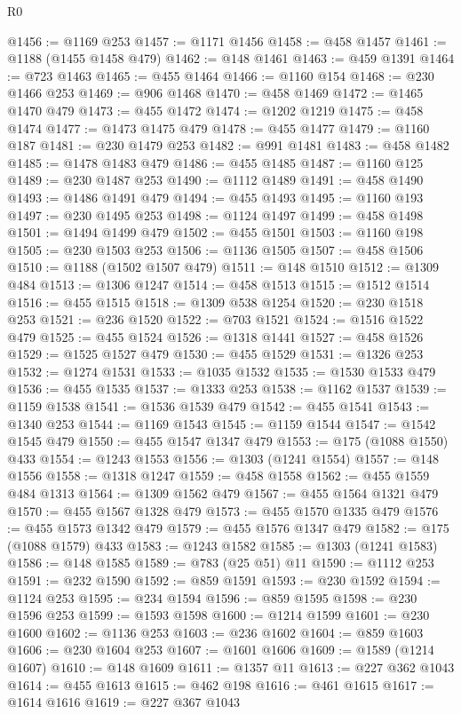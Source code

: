 \begin{lexlean}{R0}
\begin{coremodule}
@1456 := @1169 @253
@1457 := @1171 @1456
@1458 := @458 @1457
@1461 := @1188 (@1455 @1458 @479)
@1462 := @148 @1461
@1463 := @459 @1391
@1464 := @723 @1463
@1465 := @455 @1464
@1466 := @1160 @154
@1468 := @230 @1466 @253
@1469 := @906 @1468
@1470 := @458 @1469
@1472 := @1465 @1470 @479
@1473 := @455 @1472
@1474 := @1202 @1219
@1475 := @458 @1474
@1477 := @1473 @1475 @479
@1478 := @455 @1477
@1479 := @1160 @187
@1481 := @230 @1479 @253
@1482 := @991 @1481
@1483 := @458 @1482
@1485 := @1478 @1483 @479
@1486 := @455 @1485
@1487 := @1160 @125
@1489 := @230 @1487 @253
@1490 := @1112 @1489
@1491 := @458 @1490
@1493 := @1486 @1491 @479
@1494 := @455 @1493
@1495 := @1160 @193
@1497 := @230 @1495 @253
@1498 := @1124 @1497
@1499 := @458 @1498
@1501 := @1494 @1499 @479
@1502 := @455 @1501
@1503 := @1160 @198
@1505 := @230 @1503 @253
@1506 := @1136 @1505
@1507 := @458 @1506
@1510 := @1188 (@1502 @1507 @479)
@1511 := @148 @1510
@1512 := @1309 @484
@1513 := @1306 @1247
@1514 := @458 @1513
@1515 := @1512 @1514
@1516 := @455 @1515
@1518 := @1309 @538 @1254
@1520 := @230 @1518 @253
@1521 := @236 @1520
@1522 := @703 @1521
@1524 := @1516 @1522 @479
@1525 := @455 @1524
@1526 := @1318 @1441
@1527 := @458 @1526
@1529 := @1525 @1527 @479
@1530 := @455 @1529
@1531 := @1326 @253
@1532 := @1274 @1531
@1533 := @1035 @1532
@1535 := @1530 @1533 @479
@1536 := @455 @1535
@1537 := @1333 @253
@1538 := @1162 @1537
@1539 := @1159 @1538
@1541 := @1536 @1539 @479
@1542 := @455 @1541
@1543 := @1340 @253
@1544 := @1169 @1543
@1545 := @1159 @1544
@1547 := @1542 @1545 @479
@1550 := @455 @1547 @1347 @479
@1553 := @175 (@1088 @1550) @433
@1554 := @1243 @1553
@1556 := @1303 (@1241 @1554)
@1557 := @148 @1556
@1558 := @1318 @1247
@1559 := @458 @1558
@1562 := @455 @1559 @484 @1313
@1564 := @1309 @1562 @479
@1567 := @455 @1564 @1321 @479
@1570 := @455 @1567 @1328 @479
@1573 := @455 @1570 @1335 @479
@1576 := @455 @1573 @1342 @479
@1579 := @455 @1576 @1347 @479
@1582 := @175 (@1088 @1579) @433
@1583 := @1243 @1582
@1585 := @1303 (@1241 @1583)
@1586 := @148 @1585
@1589 := @783 (@25 @51) @11
@1590 := @1112 @253
@1591 := @232 @1590
@1592 := @859 @1591
@1593 := @230 @1592
@1594 := @1124 @253
@1595 := @234 @1594
@1596 := @859 @1595
@1598 := @230 @1596 @253
@1599 := @1593 @1598
@1600 := @1214 @1599
@1601 := @230 @1600
@1602 := @1136 @253
@1603 := @236 @1602
@1604 := @859 @1603
@1606 := @230 @1604 @253
@1607 := @1601 @1606
@1609 := @1589 (@1214 @1607)
@1610 := @148 @1609
@1611 := @1357 @11
@1613 := @227 @362 @1043
@1614 := @455 @1613
@1615 := @462 @198
@1616 := @461 @1615
@1617 := @1614 @1616
@1619 := @227 @367 @1043

\end{coremodule}
\end{lexlean}
